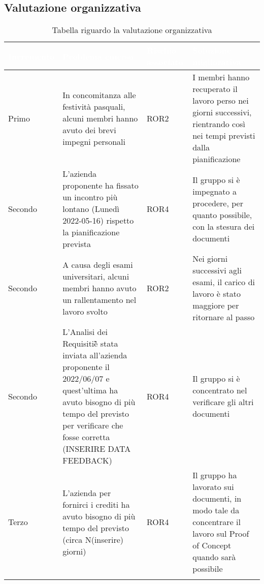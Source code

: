 \subsection{Valutazione organizzativa}
{
    \setlength{\freewidth}{\dimexpr\textwidth-10\tabcolsep}
    \renewcommand{\arraystretch}{1.5}
    \centering
    \setlength{\aboverulesep}{0pt}
    \setlength{\belowrulesep}{0pt}
    \begin{longtable}{C{.16\freewidth} C{.38\freewidth} C{.14\freewidth} C{.38\freewidth}}
       \toprule
    \textcolor{white}{\textbf{Incremento}}&
    \textcolor{white}{\textbf{Problema emerso}}&
    \textcolor{white}{\textbf{Rischio associato}}&
    \textcolor{white}{\textbf{Soluzione migliorativa}}\\	
    \toprule
    \endhead
    
   Primo & In concomitanza alle festività pasquali, alcuni membri hanno avuto dei brevi impegni personali & 
          ROR2 &I membri hanno recuperato il lavoro perso nei giorni successivi, rientrando così nei tempi previsti dalla pianificazione \\
   Secondo & L'azienda proponente ha fissato un incontro più lontano (Lunedì 2022-05-16) rispetto la pianificazione prevista &
            ROR4 & Il gruppo si è impegnato a procedere, per quanto possibile, con la stesura dei documenti \\
   Secondo & A causa degli esami universitari, alcuni membri hanno avuto un rallentamento nel lavoro svolto & 
           ROR2 & Nei giorni successivi agli esami, il carico di lavoro è stato maggiore per ritornare al passo \\
   Secondo & L'Analisi dei Requisiti\G è stata inviata all'azienda proponente il 2022/06/07 e quest'ultima ha avuto bisogno di più tempo del previsto per verificare che fosse corretta (INSERIRE DATA FEEDBACK) & ROR4 &
            Il gruppo si è concentrato nel verificare gli altri documenti \\
   Terzo & L'azienda per fornirci i crediti ha avuto bisogno di più tempo del previsto (circa N(inserire) giorni) & ROR4 & Il gruppo ha lavorato sui documenti, in modo tale da concentrare il lavoro sul Proof of Concept quando sarà possibile \\
   \bottomrule
   \caption{Tabella riguardo la valutazione organizzativa}
   \end{longtable}
}

\newpage
